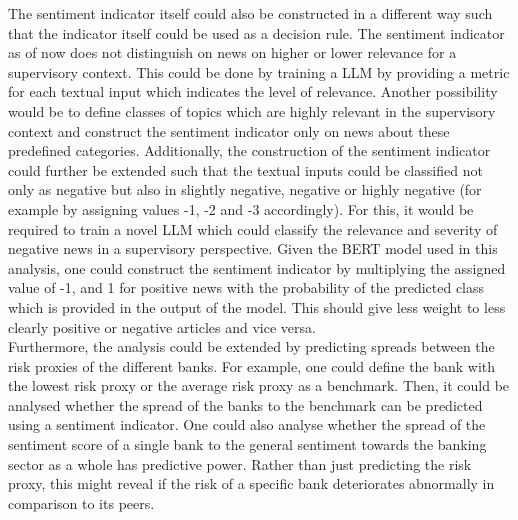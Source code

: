 The sentiment indicator itself could also be constructed in a different way such that the indicator itself could be used as a decision rule. The sentiment indicator as of now does not distinguish on news on higher or lower relevance for a supervisory context. This could be done by training a LLM by providing a metric for each textual input which indicates the level of relevance. Another possibility would be to define classes of topics which are highly relevant in the supervisory context and construct the sentiment indicator only on news about these predefined categories. Additionally, the construction of the sentiment indicator could further be extended such that the textual inputs could be classified not only as negative but also in slightly negative, negative or highly negative (for example by assigning values -1, -2 and -3 accordingly). For this, it would be required to train a novel LLM which could classify the relevance and severity of negative news in a supervisory perspective. Given the BERT model used in this analysis, one could construct the sentiment indicator by multiplying the assigned value of -1, and 1 for positive news with the probability of the predicted class which is provided in the output of the model. This should give less weight to less clearly positive or negative articles and vice versa. \\

Furthermore, the analysis could be extended by predicting spreads between the risk proxies of the different banks. For example, one could define the bank with the lowest risk proxy or the average risk proxy as a benchmark. Then, it could be analysed whether the spread of the banks to the benchmark can be predicted using a sentiment indicator. One could also analyse whether the spread of the sentiment score of a single bank to the general sentiment towards the banking sector as a whole has predictive power. Rather than just predicting the risk proxy, this might reveal if the risk of a specific bank deteriorates abnormally in comparison to its peers.


\cleardoublepage
